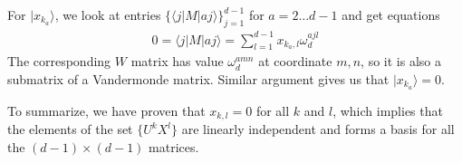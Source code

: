 \documentclass[11pt,letterpaper]{article}
\newcommand{\ket}[1]{|#1\rangle}
\newcommand{\bra}[1]{\langle#1|}
\newcommand{\1}{\mathbb{1}}
\theoremstyle{definition}
\begin{document}
For $\ket{x_{k_a}}$, we look at entries $\{\bra{j}M\ket{aj}\}_{j=1}^{d-1}$ for $a = 2 \dots d-1$ and get equations
\begin{align}
	0 = \bra{j}M\ket{aj} = \sum_{l=1}^{d-1} x_{k_a, l} \omega_d^{ajl} 
\end{align}
The corresponding $W$ matrix has value $\omega_d^{amn}$ at coordinate $m,n$,
so it is also a submatrix of a Vandermonde matrix. Similar argument gives us that $\ket{x_{k_a}} = 0$.

To summarize, we have proven that $x_{k,l} = 0$ for all $k$ and $l$, which implies that the elements of the set
$\{ U^k X^l \}$ are linearly independent and forms a basis for all the $(d-1)\times(d-1)$ matrices.
\end{document}
